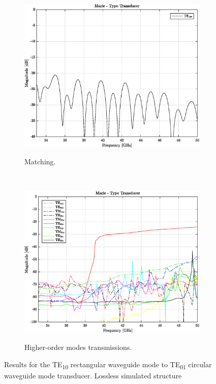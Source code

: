 \documentclass[english,twoside]{article}
\begin{document}
\begin{figure}
		      \begin{subfigure}[b]{0.48\textwidth}
				\includegraphics[width=\textwidth]{figures/marie_cst_matching}
				\label{fig:marie_cst_matching}
				\caption{Matching.}
			\end{subfigure}
			~
			\begin{subfigure}[b]{0.48\textwidth}
				\includegraphics[width=\textwidth]{figures/marie_cst_superior_modes}
				\label{fig:marie_cst_superior_modes}
				\caption{Higher-order modes transmissions.}
			\end{subfigure}
			\caption{Results for the TE\textsubscript{10} rectangular waveguide mode to TE\textsubscript{01} circular waveguide mode transducer. Lossless simulated structure}
			\label{fig:marie_cst}
		\end{figure}
    
\end{document}
